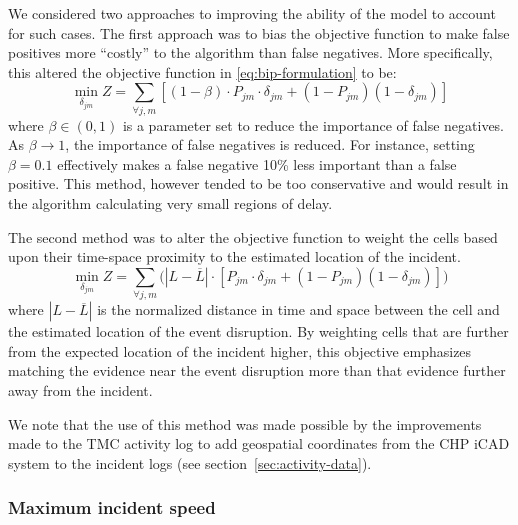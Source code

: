 \documentclass[12pt]{report}
\renewcommand{\fixme}[3][]{#1\xspace}
\newcounter{time}
\newcounter{space}
\begin{document}
We considered two approaches to improving the ability of the model to
account for such cases.  The first approach was to bias the objective
function to make false positives more ``costly'' to the algorithm than
false negatives.  More specifically, this altered the objective
function in \eqref{eq:bip-formulation} to be:
\begin{equation}
  \label{eq:false-positive-bias}
  \min\limits_{\delta_{jm}} Z = \sum\limits_{\forall{}j,m}\left[(1-\beta)\cdot{}P_{jm}\cdot{}\delta_{jm}+(1-P_{jm})(1-\delta_{jm})\right]
\end{equation}
where $\beta \in (0,1)$ is a parameter set to reduce the importance of
false negatives.  As $\beta \rightarrow 1$, the importance of false
negatives is reduced.  For instance, setting $\beta = 0.1$ effectively
makes a false negative 10\% less important than a false positive.
%
This method, however tended to be too conservative and would result in
the algorithm calculating \fixme[very small regions of
delay.]{crindt}{Give an example of this}

The second method was to alter the objective function to weight the
cells based upon their time-space proximity to the estimated location
of the incident.
\begin{equation}
    \label{eq:distance-weighting}
    \min\limits_{\delta_{jm}} Z = \sum\limits_{\forall{}j,m}\bigg(\left|L - \overline{L}\right|\cdot{}\left[P_{jm}\cdot{}\delta_{jm}+(1-P_{jm})(1-\delta_{jm})\right]\bigg)
\end{equation}
where $\left|L - \overline{L}\right|$ is the normalized distance in
time and space between the cell and the estimated location of the
event disruption.  By weighting cells that are further from the
expected location of the incident higher, this objective emphasizes
matching the evidence near the event disruption more than that
evidence further away from the incident.  


We note that the use of this method was made possible by the
improvements made to the \ac{TMC} activity log to add geospatial
coordinates from the \ac{CHP} \ac{iCAD} system to the incident logs
(see section~\ref{sec:activity-data}).


\subsubsection{Maximum incident speed}
\label{sec:max-inc-spd}
\end{document}
